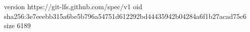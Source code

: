 version https://git-lfs.github.com/spec/v1
oid sha256:3e7eeebb315a6be5b796a54751d612292bd44435942b04284a6f1b27acad75c6
size 6189
